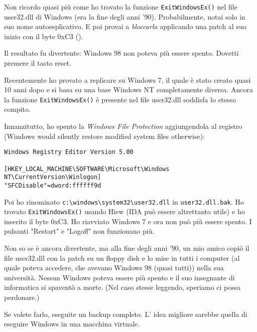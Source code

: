 
Non ricordo quasi più come ho trovato la funzione \verb|ExitWindowsEx()| nel file user32.dll di Windows (era la fine degli anni '90).
Probabilmente, notai solo in suo nome autoesplicativo.
E poi provai a \emph{bloccarla} applicando una patch al suo inizio con il byte 0xC3 ().

Il resultato fu divertente: Windows 98 non poteva più essere spento.
Dovetti premere il tasto reset.

Recentemente ho provato a replicare su Windows 7, il quale è stato creato quasi 10 anni dopo e si basa su una base Windows NT completamente diversa.
Ancora la funzione \verb|ExitWindowsEx()| è presente nel file user32.dll soddisfa lo stesso compito.

Innanzitutto, ho spento la \emph{Windows File Protection} aggiungendola al registro (Windows would silently restore modified system files otherwise):

\begin{lstlisting}
Windows Registry Editor Version 5.00

[HKEY_LOCAL_MACHINE\SOFTWARE\Microsoft\Windows NT\CurrentVersion\Winlogon]
"SFCDisable"=dword:ffffff9d
\end{lstlisting}

Poi ho rinominato \verb|c:\windows\system32\user32.dll| in \verb|user32.dll.bak|.
Ho trovato \verb|ExitWindowsEx()| usando Hiew (IDA può essere altrettanto utile) e ho inserito il byte 0xC3.
Ho riavviato Windows 7 e ora non può più essere spento.
I pulsanti "Restart" e "Logoff" non funzionano più.

Non so se è ancora divertente, ma alla fine degli anni '90, un mio amico copiò il file user32.dll con la patch su un floppy disk e lo mise in tutti i computer
(al quale poteva accedere, che avevano Windows 98 (quasi tutti)) nella sua università.
Nessun Windows poteva essere più spento e il suo insegnante di informatica si spaventò a morte.
(Nel caso stesse leggendo, speriamo ci possa perdonare.)

Se volete farlo, eseguite un backup completo.
L' idea migliore sarebbe quella di eseguire Windows in una macchina virtuale.

